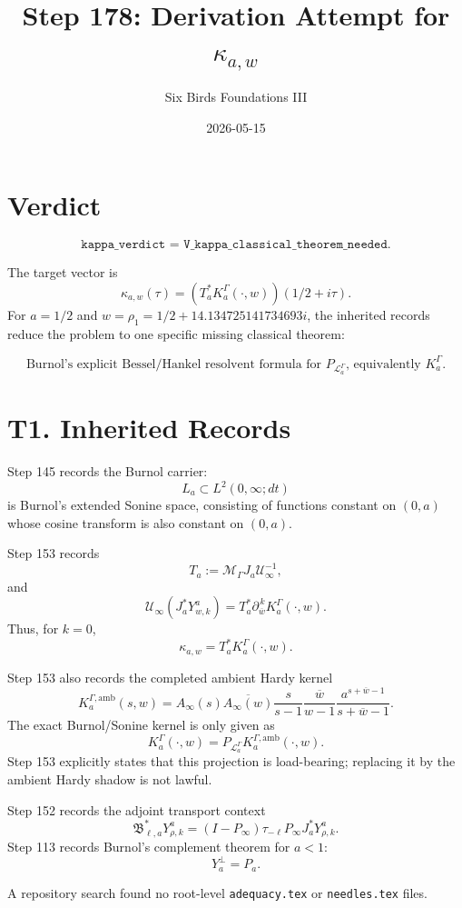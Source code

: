 \documentclass[11pt]{article}
\title{Step 178: Derivation Attempt for \(\kappa_{a,w}\)}
\author{Six Birds Foundations III}
\date{2026-05-15}
\newcommand{\MGamma}{\mathcal M_\Gamma}
\newcommand{\Uinf}{\mathcal U_\infty}
\newcommand{\Kamb}{K_a^{\Gamma,\mathrm{amb}}}
\begin{document}
\maketitle

\section{Verdict}

\[
\boxed{\texttt{kappa\_verdict = V\_kappa\_classical\_theorem\_needed}.}
\]

The target vector is
\[
\kappa_{a,w}(\tau)
=
\left(T_a^*K_a^\Gamma(\cdot,w)\right)(1/2+i\tau).
\]
For \(a=1/2\) and \(w=\rho_1=1/2+14.134725141734693i\), the inherited
records reduce the problem to one specific missing classical theorem:

\[
\boxed{
\text{Burnol's explicit Bessel/Hankel resolvent formula for }
P_{\mathcal L_a^\Gamma}
\text{, equivalently }K_a^\Gamma.
}
\]

\section{T1. Inherited Records}

Step 145 records the Burnol carrier:
\[
L_a\subset L^2(0,\infty;dt)
\]
is Burnol's extended Sonine space, consisting of functions constant on
\((0,a)\) whose cosine transform is also constant on \((0,a)\).

Step 153 records
\[
T_a:=\MGamma J_a\Uinf^{-1},
\]
and
\[
\Uinf(J_a^*Y^a_{w,k})
=
T_a^*\partial_{\overline w}^{\,k}K_a^\Gamma(\cdot,w).
\]
Thus, for \(k=0\),
\[
\kappa_{a,w}=T_a^*K_a^\Gamma(\cdot,w).
\]

Step 153 also records the completed ambient Hardy kernel
\[
\Kamb(s,w)
=
A_\infty(s)\overline{A_\infty(w)}
\frac{s}{s-1}\overline{\frac{w}{w-1}}
\frac{a^{s+\overline w-1}}{s+\overline w-1}.
\]
The exact Burnol/Sonine kernel is only given as
\[
\boxed{
K_a^\Gamma(\cdot,w)
=
P_{\mathcal L_a^\Gamma}\Kamb(\cdot,w).
}
\]
Step 153 explicitly states that this projection is load-bearing; replacing it
by the ambient Hardy shadow is not lawful.

Step 152 records the adjoint transport context
\[
\mathfrak B_{\ell,a}^*Y^a_{\rho,k}
=
(I-P_\infty)\tau_{-\ell}P_\infty J_a^*Y^a_{\rho,k}.
\]
Step 113 records Burnol's complement theorem for \(a<1\):
\[
Y_a^\perp=P_a.
\]

A repository search found no root-level \texttt{adequacy.tex} or
\texttt{needles.tex} files.
\end{document}
